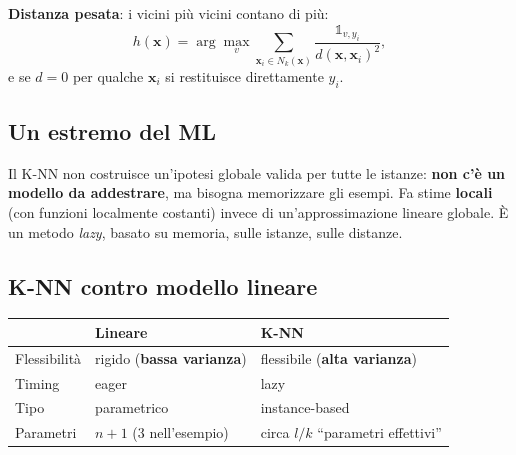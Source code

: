 \textbf{Distanza pesata}: i vicini più vicini contano di più: \[
h(\mathbf{x}) = \arg\max_v \sum_{\mathbf{x}_i \in N_k(\mathbf{x})} \frac{\mathbb{1}_{v, y_i}}{d(\mathbf{x}, \mathbf{x}_i)^2},
\] e se \(d = 0\) per qualche \(\mathbf{x}_i\) si restituisce
direttamente \(y_i\).

\subsection{Un estremo del ML}\label{un-estremo-del-ml}

Il K-NN non costruisce un'ipotesi globale valida per tutte le istanze:
\textbf{non c'è un modello da addestrare}, ma bisogna memorizzare gli
esempi. Fa stime \textbf{locali} (con funzioni localmente costanti)
invece di un'approssimazione lineare globale. È un metodo \emph{lazy},
basato su memoria, sulle istanze, sulle distanze.

\subsection{K-NN contro modello
lineare}\label{k-nn-contro-modello-lineare}

{\def\LTcaptype{none} %
\begin{longtable}[]{@{}
  >{\raggedright\arraybackslash}p{}
  >{\raggedright\arraybackslash}p{}
  >{\raggedright\arraybackslash}p{}@{}}
\toprule\noalign{}
\begin{minipage}[b]{\linewidth}\raggedright
\end{minipage} & \begin{minipage}[b]{\linewidth}\raggedright
Lineare
\end{minipage} & \begin{minipage}[b]{\linewidth}\raggedright
K-NN
\end{minipage} \\
\midrule\noalign{}
\endhead
\bottomrule\noalign{}
\endlastfoot
Flessibilità & rigido (\textbf{bassa varianza}) & flessibile
(\textbf{alta varianza}) \\
Timing & eager & lazy \\
Tipo & parametrico & instance-based \\
Parametri & \(n+1\) (3 nell'esempio) & circa \(l/k\) ``parametri
effettivi'' \\
\end{longtable}
}

